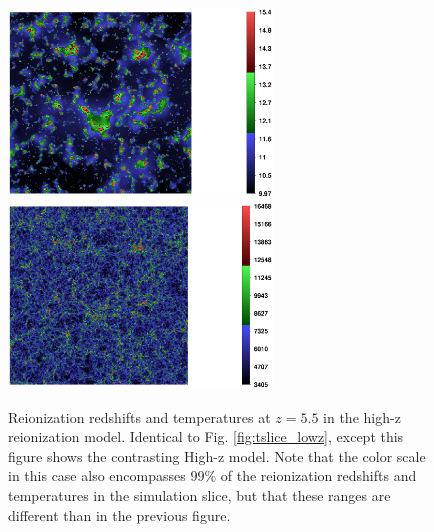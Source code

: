 \begin{figure}[t]
\bc
\includegraphics[width=7cm]{f4a.ps}
\includegraphics[width=7cm]{f4b.ps}
\caption{Reionization redshifts and temperatures at $z=5.5$ in the high-z reionization model. Identical to Fig. \ref{fig:tslice_lowz},
except this figure shows the contrasting High-z model. Note that the color scale in this case also encompasses $99\%$ of the reionization
redshifts and temperatures in the simulation slice, but that these ranges are different than in the previous figure.}
\label{fig:tslice_highz}
\ec
\end{figure}

